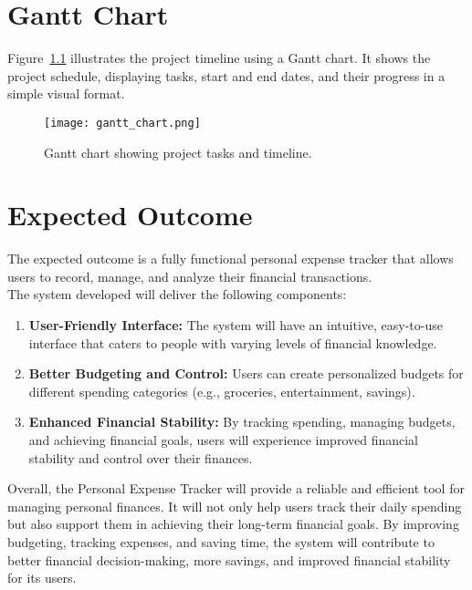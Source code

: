 \documentclass[12pt]{report} %
\begin{document}
\newpage

\chapter{Gantt Chart}
Figure~\ref{fig:gantt} illustrates the project timeline using a Gantt chart. It shows the project schedule, displaying tasks, start and end dates, and their progress in a simple visual format.

\begin{figure}[h!]
    \centering
    \texttt{[image: gantt\_chart.png]}
    \caption{Gantt chart showing project tasks and timeline.}
    \label{fig:gantt}
\end{figure}

\newpage

\chapter{Expected Outcome}
The expected outcome is a fully functional personal expense tracker that allows users to record, manage, and analyze their financial transactions. \\[3mm]
The system developed will deliver the following components:
\begin{enumerate}[label=\roman*., topsep=2pt, partopsep=0pt, itemsep=2pt, parsep=0pt]
    \renewcommand{\labelenumi}{\roman{enumi}.}
    \item \textbf{User-Friendly Interface:} The system will have an intuitive, easy-to-use interface that caters to people with varying levels of financial knowledge.
    \item \textbf{Better Budgeting and Control:} Users can create personalized budgets for different spending categories (e.g., groceries, entertainment, savings).
    \item \textbf{Enhanced Financial Stability:} By tracking spending, managing budgets, and achieving financial goals, users will experience improved financial stability and control over their finances.
\end{enumerate}

Overall, the Personal Expense Tracker will provide a reliable and efficient tool for managing personal finances. It will not only help users track their daily spending but also support them in achieving their long-term financial goals. By improving budgeting, tracking expenses, and saving time, the system will contribute to better financial decision-making, more savings, and improved financial stability for its users.
\end{document}
